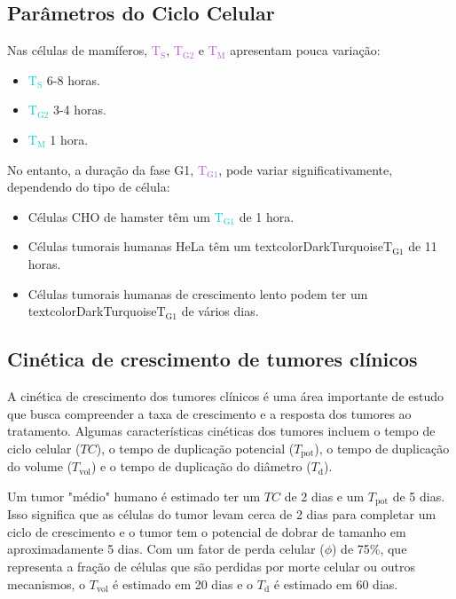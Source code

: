 \documentclass[11pt,a4paper]{article}
\begin{document}
\subsection*{Parâmetros do Ciclo Celular}

	Nas células de mamíferos, \textcolor{MediumOrchid}{\textbf{$\text{T}_\text{S}$}}, \textcolor{MediumOrchid}{\textbf{$\text{T}_\text{G2}$}} e \textcolor{MediumOrchid}{\textbf{$\text{T}_\text{M}$}} apresentam pouca variação:

	\begin{itemize}
		\item \textcolor{DarkTurquoise}{\textbf{$\text{T}_\text{S}$}} 6-8 horas.
		\item \textcolor{DarkTurquoise}{\textbf{$\text{T}_\text{G2}$}} 3-4 horas.
		\item \textcolor{DarkTurquoise}{\textbf{$\text{T}_\text{M}$}} 1 hora.
		\end{itemize}
		
		No entanto, a duração da fase G1, \textcolor{MediumOrchid}{\textbf{$\text{T}_\text{G1}$}},  pode variar significativamente, dependendo do tipo de célula:
		
		\begin{itemize}
		\item Células CHO de hamster têm um \textcolor{DarkTurquoise}{\textbf{$\text{T}_\text{G1}$}} de 1 hora.
		\item Células tumorais humanas HeLa têm um textcolor{DarkTurquoise}{\textbf{$\text{T}_\text{G1}$}} de 11 horas.
		\item Células tumorais humanas de crescimento lento podem ter um textcolor{DarkTurquoise}{\textbf{$\text{T}_\text{G1}$}} de vários dias.
	\end{itemize}

\subsection*{Cinética de crescimento de tumores clínicos}

	A cinética de crescimento dos tumores clínicos é uma área importante de estudo que busca compreender a taxa de crescimento e a resposta dos tumores ao tratamento. Algumas características cinéticas dos tumores incluem o tempo de ciclo celular ($TC$), o tempo de duplicação potencial ($T_{\text{pot}}$), o tempo de duplicação do volume ($T_{\text{vol}}$) e o tempo de duplicação do diâmetro ($T_{\text{d}}$).

	Um tumor "médio" humano é estimado ter um $TC$ de 2 dias e um $T_{\text{pot}}$ de 5 dias. Isso significa que as células do tumor levam cerca de 2 dias para completar um ciclo de crescimento e o tumor tem o potencial de dobrar de tamanho em aproximadamente 5 dias. Com um fator de perda celular ($\phi$) de 75\%, que representa a fração de células que são perdidas por morte celular ou outros mecanismos, o $T_{\text{vol}}$ é estimado em 20 dias e o $T_{\text{d}}$ é estimado em 60 dias.
\end{document}
